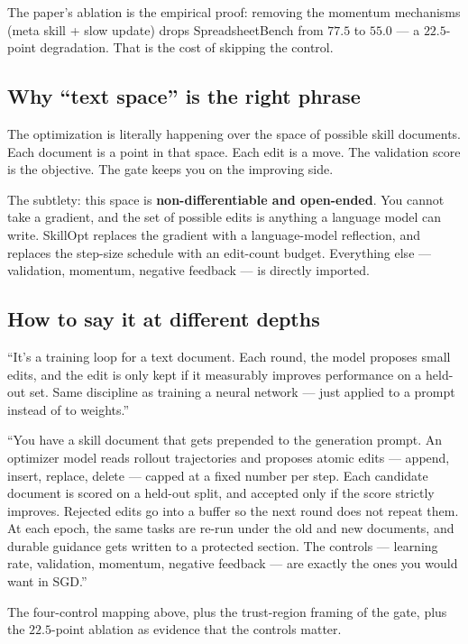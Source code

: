 \documentclass[11pt,a4paper]{article}
\begin{document}
The paper's ablation is the empirical proof: removing the momentum
mechanisms (meta skill + slow update) drops SpreadsheetBench from
\(77.5\) to \(55.0\) --- a \(22.5\)-point degradation. That is the cost
of skipping the control.

\subsection{Why ``text space'' is the right phrase}

The optimization is literally happening over the space of possible
skill documents. Each document is a point in that space. Each edit is a
move. The validation score is the objective. The gate keeps you on the
improving side.

The subtlety: this space is \textbf{non-differentiable and open-ended}.
You cannot take a gradient, and the set of possible edits is anything a
language model can write. SkillOpt replaces the gradient with a
language-model reflection, and replaces the step-size schedule with an
edit-count budget. Everything else --- validation, momentum, negative
feedback --- is directly imported.

\subsection{How to say it at different depths}

\begin{description}[leftmargin=1.2em]
  \item[Ten seconds.] ``It's a training loop for a text document.
  Each round, the model proposes small edits, and the edit is only
  kept if it measurably improves performance on a held-out set. Same
  discipline as training a neural network --- just applied to a prompt
  instead of to weights.''
  \item[Thirty seconds.] ``You have a skill document that gets
  prepended to the generation prompt. An optimizer model reads rollout
  trajectories and proposes atomic edits --- append, insert, replace,
  delete --- capped at a fixed number per step. Each candidate document
  is scored on a held-out split, and accepted only if the score
  strictly improves. Rejected edits go into a buffer so the next round
  does not repeat them. At each epoch, the same tasks are re-run under
  the old and new documents, and durable guidance gets written to a
  protected section. The controls --- learning rate, validation,
  momentum, negative feedback --- are exactly the ones you would want
  in SGD.''
  \item[Two minutes.] The four-control mapping above, plus the
  trust-region framing of the gate, plus the \(22.5\)-point ablation
  as evidence that the controls matter.
\end{description}
\end{document}
